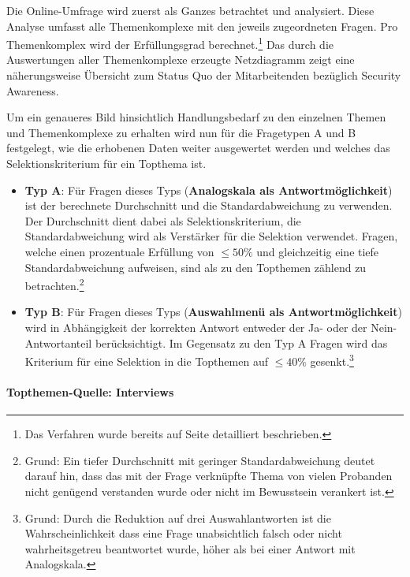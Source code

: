 \documentclass[../../main.tex]{subfiles}
\begin{document}
\begin{sloppypar}
Die Online-Umfrage wird zuerst als Ganzes betrachtet und analysiert. Diese Analyse umfasst alle Themenkomplexe mit den jeweils zugeordneten Fragen. Pro Themenkomplex wird der Erfüllungsgrad berechnet.\footnote{Das Verfahren wurde bereits auf Seite \pageref{Beispielberechnung Themenabdeckung} detailliert beschrieben.} Das durch die Auswertungen aller Themenkomplexe erzeugte Netzdiagramm zeigt eine näherungsweise Übersicht zum Status Quo der Mitarbeitenden bezüglich Security Awareness.

Um ein genaueres Bild hinsichtlich Handlungsbedarf zu den einzelnen Themen und Themenkomplexe zu erhalten wird nun für die Fragetypen A und B festgelegt, wie die erhobenen Daten weiter ausgewertet werden und welches das Selektionskriterium für ein Topthema ist.

\begin{itemize}

\item{\textbf{Typ A}: Für Fragen dieses Typs (\textbf{Analogskala als Antwortmöglichkeit}) ist der berechnete Durchschnitt und die Standardabweichung zu verwenden. Der Durchschnitt dient dabei als Selektionskriterium, die Standardabweichung wird als Verstärker für die Selektion verwendet. Fragen, welche einen prozentuale Erfüllung von $\le  50\%$ und gleichzeitig eine tiefe Standardabweichung aufweisen, sind als zu den Topthemen zählend zu betrachten.\footnote{Grund: Ein tiefer Durchschnitt mit geringer Standardabweichung deutet darauf hin, dass das mit der Frage verknüpfte Thema von vielen Probanden nicht genügend verstanden wurde oder nicht im Bewusstsein verankert ist.} }

\item{\textbf{Typ B}: Für Fragen dieses Typs (\textbf{Auswahlmenü als Antwortmöglichkeit}) wird in Abhängigkeit der korrekten Antwort entweder der Ja- oder der Nein-Antwortanteil berücksichtigt. Im Gegensatz zu den Typ A Fragen wird das Kriterium für eine Selektion in die Topthemen auf $\le 40\%$ gesenkt.\footnote{Grund: Durch die Reduktion auf drei Auswahlantworten ist die Wahrscheinlichkeit dass eine Frage unabsichtlich falsch oder nicht wahrheitsgetreu beantwortet wurde, höher als bei einer Antwort mit Analogskala.} }

\end{itemize}

\end{sloppypar}

\paragraph*{Topthemen-Quelle: Interviews}\mbox{}
\end{document}
